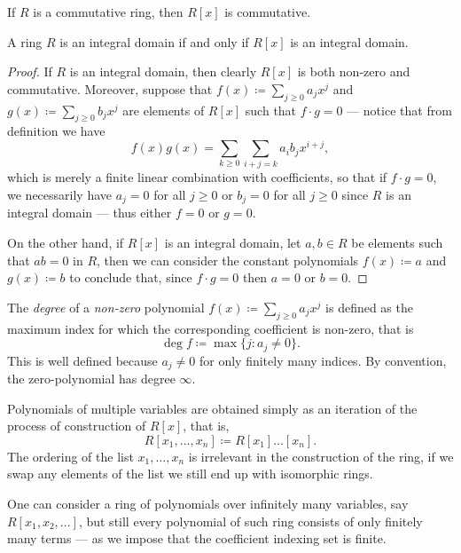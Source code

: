 %
\begin{corollary}
\label{cor:ring-R[x]-inherits-commutativity}
If \(R\) is a commutative ring, then \(R[x]\) is commutative.
\end{corollary}
%

%
\begin{lemma}
\label{lem:ring-R[x]-inherits-integral-domain}
A ring \(R\) is an integral domain if and only if \(R[x]\) is an integral
domain.
\end{lemma}
%

%
\begin{proof}
If \(R\) is an integral domain, then clearly \(R[x]\) is both non-zero and
commutative. Moreover, suppose that \(f(x) \coloneq \sum_{j \geq 0} a_j x^j\)
and \(g(x) \coloneq \sum_{j \geq 0} b_j x^j\) are elements of \(R[x]\) such that
\(f \cdot g = 0\) --- notice that from definition we have
\[
  f(x) g(x) = \sum_{k \geq 0} \sum_{i + j = k} a_i b_j x^{i + j},
\]
which is merely a finite linear combination with coefficients, so that if
\(f \cdot g = 0\), we necessarily have \(a_j = 0\) for all \(j \geq 0\) or
\(b_j = 0\) for all \(j \geq 0\) since \(R\) is an integral domain --- thus
either \(f = 0\) or \(g = 0\).

On the other hand, if \(R[x]\) is an integral domain, let \(a, b \in R\) be
elements such that \(a b = 0\) in \(R\), then we can consider the constant
polynomials \(f(x) \coloneq a\) and \(g(x) \coloneq b\) to conclude that, since
\(f \cdot g = 0\) then \(a = 0\) or \(b = 0\).
\end{proof}
%

%
\begin{definition}
\label{def:degree-polynomial}
The \emph{degree} of a \emph{non-zero} polynomial
\(f(x) \coloneq \sum_{j \geq 0} a_j x^j\) is defined as the maximum index for
which the corresponding coefficient is non-zero, that is
\[
  \deg f \coloneq \max \{j \colon a_j \neq 0\}.
\]
This is well defined because \(a_j \neq 0\) for only finitely many indices.
By convention, the zero-polynomial has degree \(\infty\).
\end{definition}
%

Polynomials of multiple variables are obtained simply as an iteration of the
process of construction of \(R[x]\), that is,
\[
  R[x_1, \dots, x_n] \coloneq R[x_1] \dots [x_n].
\]
The ordering of the list \(x_1, \dots, x_n\) is irrelevant in the construction
of the ring, if we swap any elements of the list we still end up with isomorphic
rings.

One can consider a ring of polynomials over infinitely many variables, say
\(R[x_1, x_2, \dots]\), but still every polynomial of such ring consists of only
finitely many terms --- as we impose that the coefficient indexing set is
finite.

